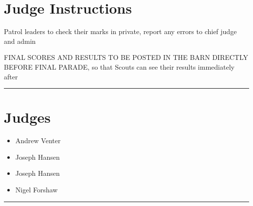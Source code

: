 \documentclass[10pt]{article}
\begin{document}
		\section*{Judge Instructions}
		Patrol leaders to check their marks in private, report any errors to chief judge and admin

FINAL SCORES AND RESULTS TO BE POSTED IN THE BARN DIRECTLY BEFORE FINAL PARADE, so that Scouts can see their results immediately after
\vspace{0.5cm}
	\hrule
	\vspace{0.5cm}
		\section*{\faUsers \: Judges}

		

	\begin{multicols}{2}

		\begin{itemize}
									\item Andrew Venter
									\item Joseph Hansen
						\end{itemize}

		\vfill\null
		\columnbreak

		\begin{itemize}
									\item Joseph Hansen
									\item Nigel Forshaw
						\end{itemize}

		\vfill\null

		\end{multicols}



			\vspace{0.5cm}
	\hrule
	\vspace{0.5cm}
\end{document}
